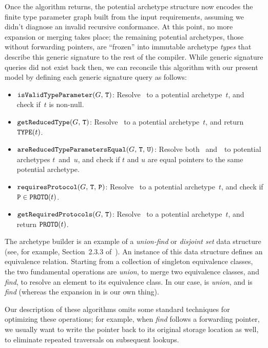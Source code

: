 \documentclass[../generics]{subfiles}
\begin{document}
Once the algorithm returns, the potential archetype structure now encodes the finite type parameter graph built from the input requirements, assuming we didn't diagnose an invalid recursive conformance. At this point, no more expansion or merging takes place; the remaining potential archetypes, those without forwarding pointers, are ``frozen'' into immutable archetype \emph{types} that describe this generic signature to the rest of the compiler. While generic signature queries did not exist back then, we can reconcile this algorithm with our present model by defining each generic signature query as follows:
\begin{itemize}
\item {}$\texttt{isValidTypeParameter}(G,\,\texttt{T})$: Resolve \tT\ to a potential archetype~$t$, and check if~$t$ is non-null.
\item {}$\texttt{getReducedType}(G,\,\texttt{T})$: Resolve \tT\ to a potential archetype~$t$, and return $\texttt{TYPE}(t)$.
\item {}$\texttt{areReducedTypeParametersEqual}(G,\,\texttt{T},\,\texttt{U})$: Resolve both \tT~and~\tU\ to potential archetypes $t$~and~$u$, and check if $t$ and $u$ are equal pointers to the same potential archetype.
\item {}$\texttt{requiresProtocol}(G,\,\texttt{T},\,\texttt{P})$: Resolve \tT\ to a potential archetype~$t$, and check if $\texttt{P}\in\texttt{PROTO}(t)$.
\item {}$\texttt{getRequiredProtocols}(G,\,\texttt{T})$: Resolve \tT\ to a potential archetype~$t$, and return $\texttt{PROTO}(t)$.
\end{itemize}

The archetype builder is an example of a \emph{union-find} or \emph{disjoint set} data structure (see, for example, Section~2.3.3 of~\cite{art1}). An instance of this data structure defines an equivalence relation. Starting from a collection of singleton equivalence classes, the two fundamental operations are \emph{union}, to merge two equivalence classes, and \emph{find}, to resolve an element to its equivalence class. In our case,  is \emph{union}, and  is \emph{find} (whereas the expansion in  is our own thing).

Our description of these algorithms omits some standard techniques for optimizing these operations; for example, when \emph{find} follows a forwarding pointer, we usually want to write the pointer back to its original storage location as well, to eliminate repeated traversals on subsequent lookups.
\end{document}
